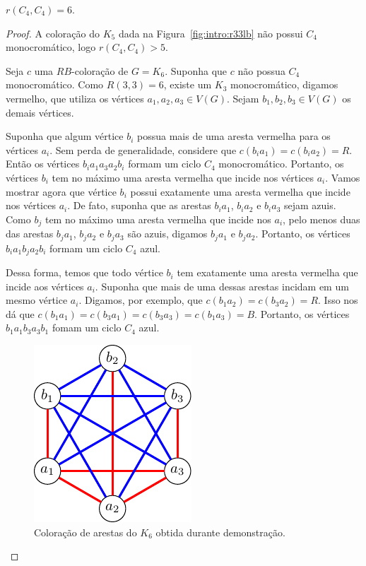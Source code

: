 \begin{theorem}
$r(C_4,C_4) = 6$.
\end{theorem}
\begin{proof}
A coloração do $K_5$ dada na Figura~\ref{fig:intro:r33lb} não possui $C_4$ monocromático, logo $r(C_4,C_4) > 5$.

Seja $c$ uma $RB$-coloração de $G = K_6$. Suponha que $c$ não possua $C_4$ monocromático. Como $R(3,3) = 6$, existe um $K_3$ monocromático, digamos vermelho, que utiliza os vértices $a_1,a_2,a_3 \in V(G)$. Sejam $b_1,b_2,b_3 \in V(G)$ os demais vértices.

Suponha que algum vértice $b_i$ possua mais de uma aresta vermelha para os vértices $a_i$. Sem perda de generalidade, considere que $c(b_ia_1) = c(b_ia_2) = R$. Então os vértices $b_i a_1 a_3 a_2 b_i$ formam um ciclo $C_4$ monocromático. Portanto, os vértices $b_i$ tem no máximo uma aresta vermelha que incide nos vértices $a_i$. Vamos mostrar agora que vértice $b_i$ possui exatamente uma aresta vermelha que incide nos vértices $a_i$. De fato, suponha que as arestas $b_i a_1$, $b_i a_2$ e $b_i a_3$ sejam azuis. Como $b_j$ tem no máximo uma aresta vermelha que incide nos $a_i$, pelo menos duas das arestas $b_j a_1$, $b_j a_2$ e $b_j a_3$ são azuis, digamos $b_j a_1$ e $b_j a_2$.
Portanto, os vértices $b_i a_1 b_j a_2 b_i$ formam um ciclo $C_4$ azul.

Dessa forma, temos que todo vértice $b_i$ tem exatamente uma aresta vermelha que incide aos vértices $a_i$. Suponha que mais de uma dessas arestas incidam em um mesmo vértice $a_i$. Digamos, por exemplo, que $c(b_1 a_2) = c(b_3 a_2) = R$. Isso nos dá que $c(b_1 a_1) = c(b_3 a_1) = c(b_3 a_3) = c(b_1 a_3) = B$. Portanto, os vértices $b_1 a_1 b_3 a_3 b_1$ fomam um ciclo $C_4$ azul.

\begin{figure}[ht!]
\centering
\includegraphics{figures/3_graph_3_cycle4}
\caption{Coloração de arestas do $K_6$ obtida durante demonstração.}
\label{graph:fig:cycle4}
\end{figure}


\end{proof}
